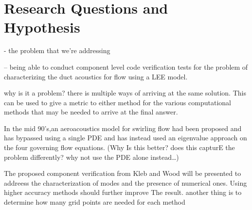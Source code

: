 \section{Research Questions and Hypothesis}


- the problem that we're addressing

-- being able to conduct component level code verification tests for the problem
of characterizing the duct acoustics for flow using a LEE model.

why is it a problem? there is multiple ways of arriving at the same solution. 
This can be used to give a metric to either method for the various computational
methods that may be needed to arrive at the final answer.

In the mid 90's,an aeroacoustics model for swirling flow had been proposed and 
has bypassed using a single PDE and has instead used an eigenvalue approach on the 
four governing flow equations. (Why Is this better? does this capturE the problem
differently? why not use the PDE alone instead\ldots)

The proposed component verification from Kleb and Wood will be presented to addreess the characterization of 
modes and the presence of numerical ones. Using higher accuracy methods should 
further improve The result. another thing is to determine how many grid points are needed
for each method


